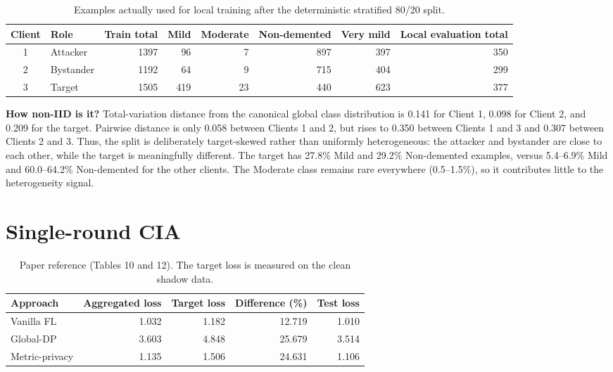 \documentclass[10pt]{article}
\begin{document}
\begin{table}[h]
\centering
\caption{Examples actually used for local training after the deterministic stratified 80/20 split.}
\begin{tabular}{clrrrrrr}
\toprule
Client & Role & Train total & Mild & Moderate & Non-demented & Very mild & Local evaluation total \\
\midrule
1 & Attacker & 1397 & 96 & 7 & 897 & 397 & 350 \\
2 & Bystander & 1192 & 64 & 9 & 715 & 404 & 299 \\
3 & Target & 1505 & 419 & 23 & 440 & 623 & 377 \\
\bottomrule
\end{tabular}
\end{table}

\textbf{How non-IID is it?} Total-variation distance from the canonical global class distribution is
0.141 for Client 1, 0.098 for Client 2, and 0.209 for the target.
Pairwise distance is only 0.058 between Clients 1 and 2, but rises to
0.350 between Clients 1 and 3 and 0.307 between Clients 2 and 3.
Thus, the split is deliberately target-skewed rather than uniformly heterogeneous: the attacker and
bystander are close to each other, while the target is meaningfully different. The target has 27.8\% Mild
and 29.2\% Non-demented examples, versus 5.4--6.9\% Mild and 60.0--64.2\% Non-demented for the other clients.
The Moderate class remains rare everywhere (0.5--1.5\%), so it contributes little to the heterogeneity signal.

\section*{Single-round CIA}

\begin{table}[h]
\centering
\caption{Paper reference (Tables 10 and 12). The target loss is measured on the clean shadow data.}
\begin{tabular}{lrrrr}
\toprule
Approach & Aggregated loss & Target loss & Difference (\%) & Test loss \\
\midrule
Vanilla FL & 1.032 & 1.182 & 12.719 & 1.010 \\
Global-DP & 3.603 & 4.848 & 25.679 & 3.514 \\
Metric-privacy & 1.135 & 1.506 & 24.631 & 1.106 \\
\bottomrule
\end{tabular}
\end{table}
\end{document}
